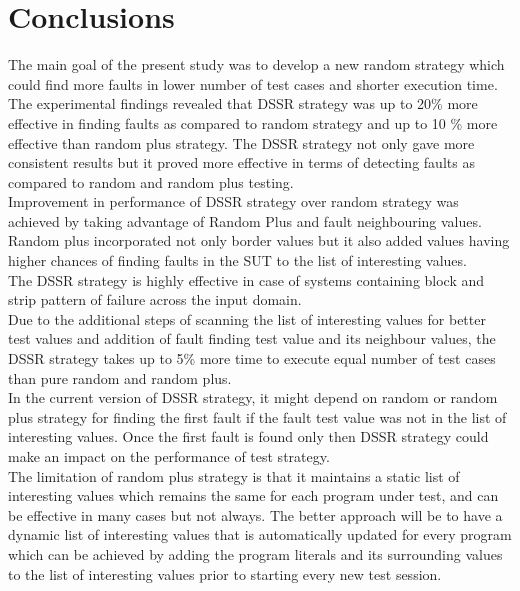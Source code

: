 \documentclass[conference]{IEEEtran}
\begin{document}


\section{Conclusions}\label{sec:conc}
The main goal of the present study was to develop a new random strategy which could find more faults in lower number of test cases and shorter execution time. The experimental findings revealed that DSSR strategy was up to 20\% more effective in finding faults as compared to random strategy and up to 10 \% more effective than random plus strategy. The DSSR strategy not only gave more consistent results but it proved more effective in terms of detecting faults as compared to random and random plus testing.\\
\indent Improvement in performance of DSSR strategy over random strategy was achieved by taking advantage of Random Plus and fault neighbouring values. Random plus incorporated not only border values but it also added values having higher chances of finding faults in the SUT to the list of interesting values.\\
\indent The DSSR strategy is highly effective in case of systems containing block and strip pattern of failure across the input domain.\\
\indent Due to the additional steps of scanning the list of interesting values for better test values and addition of fault finding test value and its neighbour values, the DSSR strategy takes up to 5\% more time to execute equal number of test cases than pure random and random plus. \\
\indent In the current version of DSSR strategy, it might depend on random or random plus strategy for finding the first fault if the fault test value was not in the list of interesting values. Once the first fault is found only then DSSR strategy could make an impact on the performance of test strategy.\\
\indent The limitation of random plus strategy is that it maintains a static list of interesting values which remains the same for each program under test, and can be effective in many cases but not always. The better approach will be to have a dynamic list of interesting values that is automatically updated for every program which can be achieved by adding the program literals and its surrounding values to the list of interesting values prior to starting every new test session.


\end{document}
